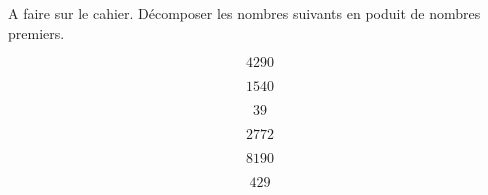 A faire sur le cahier. Décomposer les nombres suivants en poduit de nombres premiers.
\begin{multicols}{3}
$$4290$$

$$1540$$\columnbreak

$$39$$

$$2772$$\columnbreak

$$8190$$

$$429$$\columnbreak

\end{multicols}